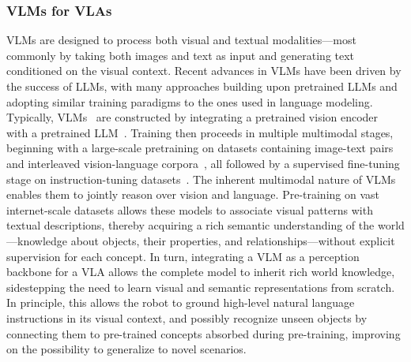 \subsubsection{VLMs for VLAs}
VLMs are designed to process both visual and textual modalities---most commonly by taking both images and text as input and generating text conditioned on the visual context.
Recent advances in VLMs have been driven by the success of LLMs, with many approaches building upon pretrained LLMs and adopting similar training paradigms to the ones used in language modeling.
Typically, VLMs~\citep{alayracFlamingoVisualLanguage2022,laurenconWhatMattersWhen2024,linVILAPretrainingVisual2024} are constructed by integrating a pretrained vision encoder~\citep{radfordLearningTransferableVisual2021,zhaiSigmoidLossLanguage2023,finiMultimodalAutoregressivePretraining2024} with a pretrained LLM~\citep{grattafioriLlama3Herd2024,jiangMistral7B2023}.
Training then proceeds in multiple multimodal stages, beginning with a large-scale pretraining on datasets containing image-text pairs~\citep{LAION-COCO,kakaobrain2022coyo700m} and interleaved vision-language corpora~\citep{OBELICS,MMC4}, all followed by a supervised fine-tuning stage on instruction-tuning datasets~\citep{LLaVA-1.5,tong2024cambrian,laurenconWhatMattersWhen2024}.
The inherent multimodal nature of VLMs enables them to jointly reason over vision and language. 
Pre-training on vast internet-scale datasets allows these models to associate visual patterns with textual descriptions, thereby acquiring a rich semantic understanding of the world---knowledge about objects, their properties, and relationships---without explicit supervision for each concept. 
In turn, integrating a VLM as a perception backbone for a VLA allows the complete model to inherit rich world knowledge, sidestepping the need to learn visual and semantic representations from scratch. 
In principle, this allows the robot to ground high-level natural language instructions in its visual context, and possibly recognize unseen objects by connecting them to pre-trained concepts absorbed during pre-training, improving on the possibility to generalize to novel scenarios.

